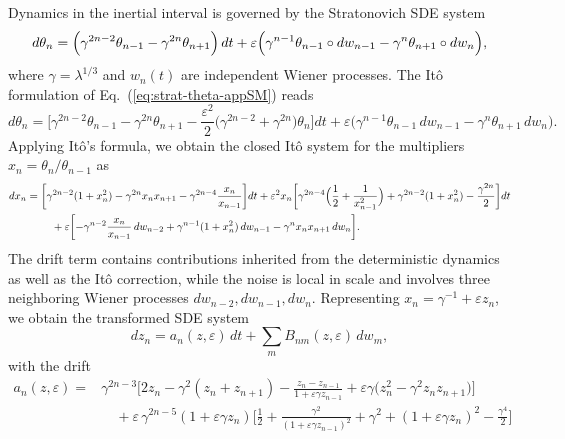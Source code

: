 \documentclass[aps,twocolumn,superscriptaddress]{revtex4-2}
\begin{document}
Dynamics in the inertial interval is governed by the Stratonovich SDE system
\begin{equation}\label{eq:strat-theta-appSM}
d\theta_n
=
\Bigl(
\gamma^{2n-2}\theta_{n-1}
-\gamma^{2n}\theta_{n+1}
\Bigr)\,dt
+\varepsilon
\Bigl(
\gamma^{n-1}\theta_{n-1}\circ dw_{n-1}
-\gamma^n \theta_{n+1}\circ dw_n
\Bigr),
\end{equation}
where $\gamma=\lambda^{1/3}$ and $w_n(t)$ are independent Wiener processes.
The It\^o formulation of Eq.~(\ref{eq:strat-theta-appSM}) reads
\begin{equation}\label{eq:ito-theta-app}
d\theta_n
=
\Big[
\gamma^{2n-2}\theta_{n-1}
-\gamma^{2n}\theta_{n+1}
-\frac{\varepsilon^2}{2}\bigl(\gamma^{2n-2}+\gamma^{2n}\bigr)\theta_n
\Big]dt
+\varepsilon
\bigl(
\gamma^{n-1}\theta_{n-1}\,dw_{n-1}
-\gamma^n\theta_{n+1}\,dw_n
\bigr).
\end{equation}
Applying It\^o's formula, we obtain the closed It\^o system for the multipliers $x_n = \theta_n/\theta_{n-1}$ as
\begin{equation}\label{eq:xn-full-app}
\begin{aligned}
dx_n
={}&
\biggl[
\gamma^{2n-2}(1+x_n^2)
-\gamma^{2n}x_n x_{n+1}
-\gamma^{2n-4}\frac{x_n}{x_{n-1}}
\biggr]dt
+\varepsilon^2 x_n
\biggl[
\gamma^{2n-4}\Bigl(\frac12+\frac{1}{x_{n-1}^2}\Bigr)
+\gamma^{2n-2}(1+x_n^2)
-\frac{\gamma^{2n}}{2}
\biggr]dt
\\
&\quad
+\varepsilon
\biggl[
-\gamma^{n-2}\frac{x_n}{x_{n-1}}\,dw_{n-2}
+\gamma^{n-1}(1+x_n^2)\,dw_{n-1}
-\gamma^n x_n x_{n+1}\,dw_n
\biggr].
\end{aligned}
\end{equation}
The drift term contains contributions inherited from the deterministic dynamics as well as the It\^o correction, while the noise is local in scale and involves three neighboring Wiener processes \(dw_{n-2},dw_{n-1},dw_n\).
Representing $x_n=\gamma^{-1}+\varepsilon z_n$, we obtain the transformed SDE system
\begin{equation}
dz_n = a_n(z,\varepsilon)\,dt+\sum_{m} B_{nm}(z,\varepsilon)\,dw_m,
\label{eq_SDE_zSM}
\end{equation}
with the drift
\begin{equation}
\begin{aligned}
a_n(z,\varepsilon)
={}&
\gamma^{2n-3}
\Bigg[
2z_n-\gamma^2(z_n+z_{n+1})
-\frac{z_n-z_{n-1}}{1+\varepsilon\gamma z_{n-1}}
+\varepsilon\gamma\bigl(z_n^2-\gamma^2 z_n z_{n+1}\bigr)
\Bigg]
\\
&\quad
+\varepsilon\,\gamma^{2n-5}(1+\varepsilon\gamma z_n)
\Bigg[
\frac12+\frac{\gamma^2}{(1+\varepsilon\gamma z_{n-1})^2}
+\gamma^2+(1+\varepsilon\gamma z_n)^2-\frac{\gamma^4}{2}
\Bigg]
\end{aligned}
\label{eq:drift_an}
\end{equation}
\end{document}
